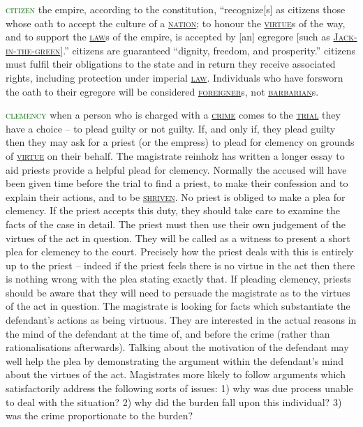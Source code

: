\documentclass[twoside,11pt,b5paper,twocolumn]{scrbook}
\newcommand{\estcab}[1]{\textsc{\textcolor{marron}{#1}}}
\renewcommand{\paragraph}[1]{\par\noindent\markboth{#1}{#1}\estcab{\textcolor{darkgreen}{#1}}\label{#1} }
\newcommand{\see}[1]{{\estcab{\hyperref[#1]{#1}}}}
\begin{document}
\paragraph{citizen} the empire, according to the constitution, “recognize[s] as citizens those whose oath to accept the culture of a \see{nation}; to honour the \see{virtue}s of the way, and to support the \see{law}s of the empire, is accepted by [an] egregore [such as \see{Jack-in-the-green}].” citizens are guaranteed “dignity, freedom, and prosperity.” citizens must fulfil their obligations to the state and in return they receive associated rights, including protection under imperial \see{law}. Individuals who have forsworn the oath to their egregore will be considered \see{foreigner}s, not \see{barbarian}s.
\paragraph{clemency} when a person who is charged with a \see{crime} comes to the \see{trial} they have a choice – to plead guilty or not guilty. If, and only if, they plead guilty then they may ask for a priest (or the empress) to plead for clemency on grounds of \see{virtue} on their behalf. The magistrate reinholz has written a longer essay to aid priests provide a helpful plead for clemency. Normally the accused will have been given time before the trial to find a priest, to make their confession and to explain their actions, and to be \see{shriven}. No priest is obliged to make a plea for clemency. If the priest accepts this duty, they should take care to examine the facts of the case in detail. The priest must then use their own judgement of the virtues of the act in question. They will be called as a witness to present a short plea for clemency to the court. Precisely how the priest deals with this is entirely up to the priest – indeed if the priest feels there is no virtue in the act then there is nothing wrong with the plea stating exactly that. If pleading clemency, priests should be aware that they will need to persuade the magistrate as to the virtues of the act in question. The magistrate is looking for facts which substantiate the defendant's actions as being virtuous. They are interested in the actual reasons in the mind of the defendant at the time of, and before the crime (rather than rationalisations afterwards). Talking about the motivation of the defendant may well help the plea by demonstrating the argument within the defendant's mind about the virtues of the act. Magistrates more likely to follow arguments which satisfactorily address the following sorts of issues: 1) why was due process unable to deal with the situation? 2) why did the burden fall upon this individual? 3) was the crime proportionate to the burden? 
\end{document}
